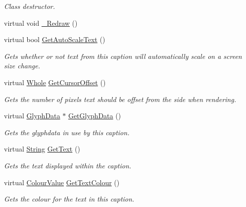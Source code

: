 \begin{DoxyCompactItemize}
\begin{DoxyCompactList}\small\item\em Class destructor. \item\end{DoxyCompactList}\item 
virtual void \hyperlink{classMezzanine_1_1UI_1_1Caption_aba11ec4c0ed480eb4210031c0a370f7e}{\_\-Redraw} ()
\item 
virtual bool \hyperlink{classMezzanine_1_1UI_1_1Caption_a2b83af8d15b35ba37661157cc376910d}{GetAutoScaleText} ()
\begin{DoxyCompactList}\small\item\em Gets whether or not text from this caption will automatically scale on a screen size change. \item\end{DoxyCompactList}\item 
virtual \hyperlink{namespaceMezzanine_adcbb6ce6d1eb4379d109e51171e2e493}{Whole} \hyperlink{classMezzanine_1_1UI_1_1Caption_a93da9adffc448e61d7fea14ab84c5421}{GetCursorOffset} ()
\begin{DoxyCompactList}\small\item\em Gets the number of pixels text should be offset from the side when rendering. \item\end{DoxyCompactList}\item 
virtual \hyperlink{classMezzanine_1_1UI_1_1GlyphData}{GlyphData} $\ast$ \hyperlink{classMezzanine_1_1UI_1_1Caption_adee750f4077781c09a17ea7f614d0256}{GetGlyphData} ()
\begin{DoxyCompactList}\small\item\em Gets the glyphdata in use by this caption. \item\end{DoxyCompactList}\item 
virtual \hyperlink{namespaceMezzanine_acf9fcc130e6ebf08e3d8491aebcf1c86}{String} \hyperlink{classMezzanine_1_1UI_1_1Caption_a84706720c8bf07eede9bbeecbf235a79}{GetText} ()
\begin{DoxyCompactList}\small\item\em Gets the text displayed within the caption. \item\end{DoxyCompactList}\item 
virtual \hyperlink{classMezzanine_1_1ColourValue}{ColourValue} \hyperlink{classMezzanine_1_1UI_1_1Caption_a7ef9a623d363094bafe9162d89cbcb2c}{GetTextColour} ()
\begin{DoxyCompactList}\small\item\em Gets the colour for the text in this caption. \item\end{DoxyCompactList}\item 

\end{DoxyCompactItemize}
